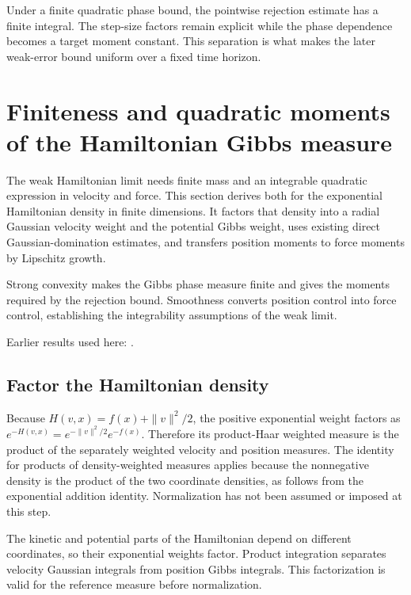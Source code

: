 \documentclass[11pt,a4paper]{report}
\begin{document}
Under a finite quadratic phase bound, the pointwise rejection estimate has a finite integral. The step-size factors remain explicit while the phase dependence becomes a target moment constant. This separation is what makes the later weak-error bound uniform over a fixed time horizon.

\section{\texorpdfstring{Finiteness and quadratic moments of the Hamiltonian Gibbs measure}{Finiteness and quadratic moments of the Hamiltonian Gibbs measure}}
\label{proof-module-KineticLangevin-HamiltonianMoments-lean}


The weak Hamiltonian limit needs finite mass and an integrable quadratic expression in velocity and force. This section derives both for the exponential Hamiltonian density in finite dimensions. It factors that density into a radial Gaussian velocity weight and the potential Gibbs weight, uses existing direct Gaussian-domination estimates, and transfers position moments to force moments by Lipschitz growth.



Strong convexity makes the Gibbs phase measure finite and gives the moments required by the rejection bound. Smoothness converts position control into force control, establishing the integrability assumptions of the weak limit.



Earlier results used here: \cite[Section~3.26]{LangevinLean2026ULASC}.
\subsection{\texorpdfstring{Factor the Hamiltonian density}{Factor the Hamiltonian density}}
\label{report-step-KineticLangevin-HamiltonianMoments-lean-1}


Because \(H(v,x)=f(x)+\|v\|^2/2\), the positive exponential weight factors as \(e^{-H(v,x)}=e^{-\|v\|^2/2}e^{-f(x)}\). Therefore its product-Haar weighted measure is the product of the separately weighted velocity and position measures. The identity for products of density-weighted measures applies because the nonnegative density is the product of the two coordinate densities, as follows from the exponential addition identity. Normalization has not been assumed or imposed at this step.



The kinetic and potential parts of the Hamiltonian depend on different coordinates, so their exponential weights factor. Product integration separates velocity Gaussian integrals from position Gibbs integrals. This factorization is valid for the reference measure before normalization.
\end{document}
